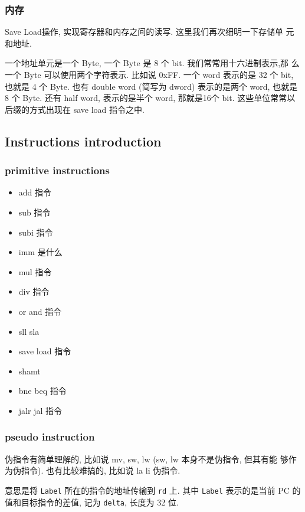 \documentclass[11pt]{article}
\begin{document}
\subsubsection{内存}
\label{sec:org6c8bd8b}

Save Load操作, 实现寄存器和内存之间的读写. 这里我们再次细明一下存储单
元和地址. 

一个地址单元是一个 Byte, 一个 Byte 是 8 个 bit. 我们常常用十六进制表示,那
么一个 Byte 可以使用两个字符表示. 比如说 0xFF. 一个 word 表示的是 32
个 bit, 也就是 4 个 Byte. 也有 double word (简写为 dword) 表示的是两个
word, 也就是 8 个 Byte. 还有 half word, 表示的是半个 word, 那就是16个
bit. 这些单位常常以后缀的方式出现在 save load 指令之中. 


\subsection{Instructions introduction}
\label{sec:orgcd37201}
\subsubsection{primitive instructions}
\label{sec:org5cf24f7}

\begin{itemize}
\item add 指令
\item sub 指令
\item subi 指令
\item imm 是什么
\item mul 指令
\item div 指令
\item or and 指令
\item sll sla
\item save load 指令
\item shamt
\item bne beq 指令
\item jalr jal 指令
\end{itemize}

\subsubsection{pseudo instruction}
\label{sec:org598dada}
伪指令有简单理解的, 比如说 mv, sw, lw (sw, lw 本身不是伪指令, 但其有能
够作为伪指令). 也有比较难搞的, 比如说 la li 伪指令.

意思是将 \texttt{Label} 所在的指令的地址传输到 \texttt{rd} 上. 其中 \texttt{Label} 表示的是当前 PC 的值和目标指令的差值, 记为 \texttt{delta}, 长度为 32 位. 
\end{document}
